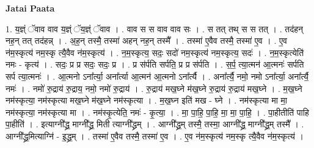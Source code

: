 \documentclass[17pt]{extarticle}
\begin{document}
\textbf{Jatai Paata} \newline

1. य॒ज्ञ्ं ॅवाव वाव य॒ज्ञ्ं ॅय॒ज्ञ्ं ॅवाव । . वाव स स वाव वाव सः । . स तत् तथ् स स तत् । . तद॑हन् नह॒न् तत् तद॑हन्न् । . अ॒ह॒न् तस्मै॒ तस्मा॑ अहन् नह॒न् तस्मै᳚ । . तस्मा॑ ए॒वैव तस्मै॒ तस्मा॑ ए॒व । . ए॒व न॑म॒स्कृत्य॑ नम॒स्कृ त्यै॒वैव न॑म॒स्कृत्य॑ । . न॒म॒स्कृत्य॒ सदः॒ सदो॑ नम॒स्कृत्य॑ नम॒स्कृत्य॒ सदः॑ । . न॒म॒स्कृत्येति॑ नमः - कृत्य॑ । . सदः॒ प्र प्र सदः॒ सदः॒ प्र । . प्र स॑र्पति सर्पति॒ प्र प्र स॑र्पति । . स॒र्प॒ त्या॒त्मन॑ आ॒त्मनः॑ सर्पति सर्प त्या॒त्मनः॑ । . आ॒त्मनो ऽना᳚र्त्या॒ अना᳚र्त्या आ॒त्मन॑ आ॒त्मनो ऽना᳚र्त्यै । . अना᳚र्त्यै॒ नमो॒ नमो ऽना᳚र्त्या॒ अना᳚र्त्यै॒ नमः॑ । . नमो॑ रु॒द्राय॑ रु॒द्राय॒ नमो॒ नमो॑ रु॒द्राय॑ । . रु॒द्राय॑ मख॒घ्ने म॑ख॒घ्ने रु॒द्राय॑ रु॒द्राय॑ मख॒घ्ने । . म॒ख॒घ्ने नम॑स्कृत्या॒ नम॑स्कृत्या मख॒घ्ने म॑ख॒घ्ने नम॑स्कृत्या । . म॒ख॒घ्न इति॑ मख - घ्ने । . नम॑स्कृत्या मा मा॒ नम॑स्कृत्या॒ नम॑स्कृत्या मा । . नम॑स्कृ॒त्येति॒ नमः॑ - कृ॒त्या॒ । . मा॒ पा॒हि॒ पा॒हि॒ मा॒ मा॒ पा॒हि॒ । . पा॒हीतीति॑ पाहि पा॒हीति॑ । . इत्याग्नी᳚द्ध्र॒ माग्नी᳚द्ध्र॒ मिती त्याग्नी᳚द्ध्रम् । . आग्नी᳚द्ध्र॒म् तस्मै॒ तस्मा॒ आग्नी᳚द्ध्र॒ माग्नी᳚द्ध्र॒म् तस्मै᳚ । . आग्नी᳚द्ध्र॒मित्याग्नि॑ - इ॒द्ध्र॒म् । . तस्मा॑ ए॒वैव तस्मै॒ तस्मा॑ ए॒व । . ए॒व न॑म॒स्कृत्य॑ नम॒स्कृ त्यै॒वैव न॑म॒स्कृत्य॑ । \newline
\end{document}
